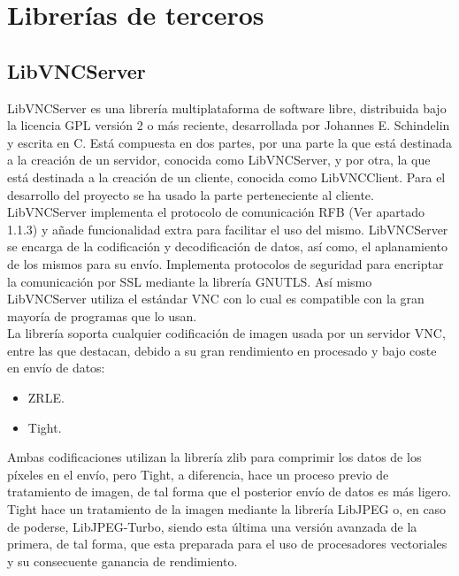 \section{Librerías de terceros}
\subsection{LibVNCServer}
LibVNCServer\cite{LibVNC:LibVNC} es una librería multiplataforma de software libre, distribuida bajo la licencia GPL versión 2 o más reciente, desarrollada por Johannes E. Schindelin y escrita en C. Está compuesta en dos partes, por una parte la que está destinada a la creación de un servidor, conocida como LibVNCServer, y por otra, la que está destinada a la creación de un cliente, conocida como LibVNCClient. Para el desarrollo del proyecto se ha usado la parte perteneciente al cliente.\\

LibVNCServer implementa el protocolo de comunicación RFB (Ver apartado 1.1.3) y añade funcionalidad extra para facilitar el uso del mismo. LibVNCServer se encarga de la codificación y decodificación de datos, así como, el aplanamiento de los mismos para su envío. Implementa protocolos de seguridad para encriptar la comunicación por SSL mediante la librería GNUTLS. Así mismo LibVNCServer utiliza el estándar VNC con lo cual es compatible con la gran mayoría de programas que lo usan.\\

La librería soporta cualquier codificación de imagen usada por un servidor VNC, entre las que destacan, debido a su gran rendimiento en procesado y bajo coste en envío de datos:
\begin{itemize}
\item ZRLE.
\item Tight.
\end{itemize}

Ambas codificaciones utilizan la librería zlib para comprimir los datos de los píxeles en el envío, pero Tight, a diferencia, hace un proceso previo de tratamiento de imagen, de tal forma que el posterior envío de datos es más ligero.\\

Tight hace un tratamiento de la imagen mediante la librería LibJPEG o, en caso de poderse, LibJPEG-Turbo, siendo esta última una versión avanzada de la primera, de tal forma, que esta preparada para el uso de procesadores vectoriales y su consecuente ganancia de rendimiento.\\

